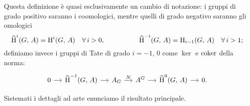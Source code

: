 \begin{definition}
	Questa definizione è quasi esclusivamente un cambio di notazione: i gruppi di grado positivo saranno i coomologici, mentre quelli di grado negativo saranno gli omologici
	\[ \operatorname{\widehat{H}}^i(G, \, A) = \operatorname{H}^i(G, \, A) \quad \forall\, i > 0, \qquad\quad\qquad \operatorname{\widehat{H}}^{-i}(G, \, A) = \operatorname{H}_{i-1}(G, \, A) \quad \forall\, i > 1;
	 \]
	 definiamo invece i gruppi di Tate di grado $ i = -1, \, 0 $ come $ \ker $ e $ \operatorname{coker} $ della norma:
	 \begin{equation}
	 	\begin{tikzcd}[column sep = small]
	 	0 \rar& \Hh^{-1}(G, \, A) \rar& A_G \rar["N"]& A^G \rar&\Hh^0(G, \, A) \rar& 0.
	 	\end{tikzcd}
	 \end{equation}
\end{definition}

Sistemati i dettagli ad arte enunciamo il risultato principale.

